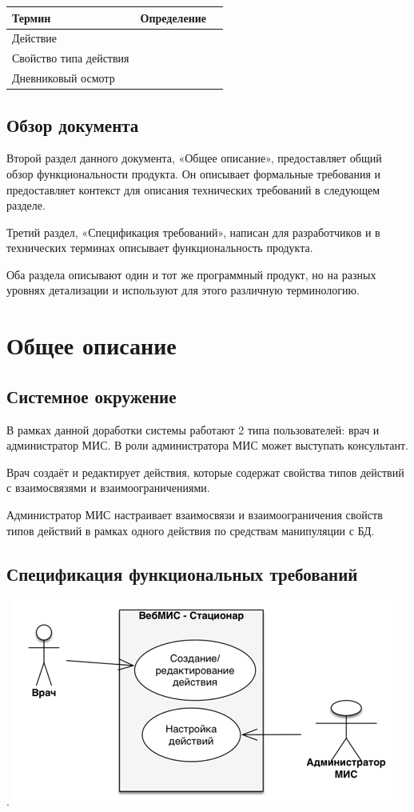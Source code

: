 \documentclass[a4paper,8pt]{report} %
\begin{document}
{ \begin{tabularx}{\textwidth}{ |X|X|X| }
    \hline
    \textbf{Термин} & \textbf{Определение}\\
    \hline
    Действие & \\
    \hline
    Свойство типа действия & \\
    \hline
    Дневниковый осмотр & \\
    \hline
 \end{tabularx}

 \subsection{Обзор документа}
    Второй раздел данного документа, «Общее описание», предоставляет общий обзор
    функциональности продукта. Он описывает формальные требования и предоставляет
    контекст для описания технических требований в следующем разделе.

    Третий раздел, «Спецификация требований», написан для разработчиков и в
    технических терминах описывает функциональность продукта.

    Оба раздела описывают один и тот же программный продукт, но на разных уровнях
    детализации и используют для этого различную терминологию.

 \section{Общее описание}
 \subsection{Системное окружение}
    В рамках данной доработки системы работают 2 типа пользователей: врач и
    администратор МИС. В роли администратора МИС может выступать консультант.

    Врач создаёт и редактирует действия, которые содержат свойства типов действий
    с взаимосвязями и взаимоограничениями.

    Администратор МИС настраивает взаимосвязи и взаимоограничения свойств типов
    действий в рамках одного действия по средствам манипуляции с БД.

 \subsection{Спецификация функциональных требований}  .
 \includegraphics{roles}

}
\end{document}
